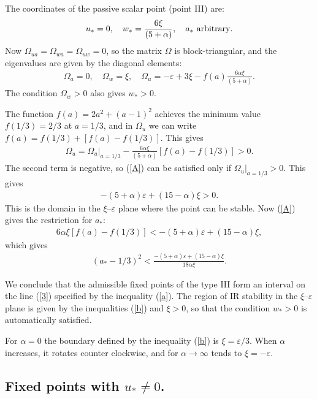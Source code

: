 \documentclass[12pt]{iopart}
\begin{document}
The coordinates of the passive scalar point (point III) are:
\begin{eqnarray}
u_{*}=0, \quad w_{*}= \frac{6\xi}{(5+\alpha)},
\quad a_{*} \ {\rm arbitrary}.
\label{3f}
\end{eqnarray}
Now $\Omega_{ua}=\Omega_{wa}=\Omega_{uw}=0$, so the matrix $\Omega$ is
block-triangular, and the eigenvalues are given by the diagonal elements:
\begin{eqnarray}
\Omega_{a}=0, \quad \Omega_{w}=\xi, \quad
\Omega_{u}= - \varepsilon +3\xi - f(a) \frac{6\alpha\xi}{(5+\alpha)}.
\label{omega3}
\end{eqnarray}
The condition $\Omega_{w}>0$ also gives $w_{*}>0$.


The function $f(a)=2a^{2}+(a-1)^{2}$ achieves the minimum value
$f(1/3)=2/3$ at $a=1/3$, and in
$\Omega_{u}$ we can write $f(a) = f(1/3) + [f(a)-f(1/3)]$. This gives
\begin{eqnarray}
\Omega_{u} = \Omega_{u}|_{a=1/3} -  \frac{6\alpha\xi}{(5+\alpha)}
[f(a)-f(1/3)] >0 .
\label{A}
\end{eqnarray}
The second term is negative, so (\ref{A}) can be satisfied only if
$\Omega_{u}|_{a=1/3}>0$. This gives
\begin{eqnarray}
-(5+\alpha) \varepsilon +(15-\alpha) \xi >0.
\label{b}
\end{eqnarray}
This is the domain in the $\xi$--$\varepsilon$ plane where the point
can be stable. Now (\ref{A}) gives the restriction for $a_{*}$:
\begin{eqnarray}
6\alpha\xi [f(a)-f(1/3)] <  -(5+\alpha) \varepsilon +(15-\alpha) \xi,
\label{V}
\end{eqnarray}
which gives
\begin{eqnarray}
(a_{*}-1/3)^{2} < \frac {-(5+\alpha) \varepsilon +
(15-\alpha) \xi}{18\alpha\xi}.
\label{a}
\end{eqnarray}

We conclude that the admissible fixed points of the type III
form an interval
on the line (\ref{3}) specified by the inequality (\ref{a}).
The region of IR stability in the $\xi$--$\varepsilon$ plane
is given by the inequalities (\ref{b}) and $\xi>0$, so that
the condition $w_{*}>0$ is automatically satisfied.


For $\alpha=0$ the boundary defined by the inequality (\ref{b}) is
$\xi=\varepsilon/3$. When $\alpha$ increases, it rotates counter clockwise,
and for $\alpha\to\infty$ tends to $\xi=-\varepsilon$.

\subsection{Fixed points with $u_{*}\ne0$.} \label{nfp}
\end{document}

